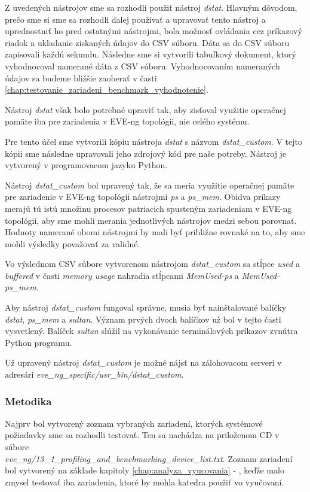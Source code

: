 Z uvedených nástrojov sme sa rozhodli použiť nástroj \emph{dstat}. Hlavným dôvodom, prečo sme si sme sa rozhodli ďalej používať a upravovať tento nástroj a uprednostniť ho pred ostatnými nástrojmi, bola možnosť ovládania cez príkazový riadok a ukladanie ziskaných údajov do CSV súboru. Dáta sa do CSV súboru zapisovali každú sekundu. Následne sme si vytvorili tabuľkový dokument, ktorý vyhodnocoval namerané dáta z CSV súboru. Vyhodnocovaním nameraných údajov sa budeme bližšie zaoberať v časti \ref{chap:testovanie_zariadeni_benchmark_vyhodnotenie}.

Nástroj \emph{dstat} však bolo potrebné upraviť tak, aby zisťoval využitie operačnej pamäte iba pre zariadenia v EVE-ng topológii, nie celého systému.

Pre tento účel sme vytvorili kópiu nástroja \emph{dstat} s názvom \emph{dstat\_custom}. V tejto kópii sme následne upravovali jeho zdrojový kód pre naše potreby. Nástroj je vytvorený v programovacom jazyku Python.

Nástroj \emph{dstat\_custom} bol upravený tak, že sa meria využitie operačnej pamäte pre zariadenie v EVE-ng topológii nástrojmi \emph{ps} a \emph{ps\_mem}. Obidva príkazy merajú tú istú množinu procesov patriacich spusteným zariadeniam v EVE-ng topológii, aby sme mohli merania jednotlivých nástrojov medzi sebou porovnať. Hodnoty namerané obomi nástrojmi by mali byť približne rovnaké na to, aby sme mohli výsledky považovať za validné.

Vo výslednom CSV súbore vytvorenom nástrojom \emph{dstat\_custom} sa stĺpce \emph{used} a \emph{buffered} v časti \emph{memory usage} nahradia stĺpcami \emph{MemUsed-ps} a \emph{MemUsed-ps\_mem}.

Aby nástroj \emph{dstat\_custom} fungoval správne, musia byť nainštalované balíčky \emph{dstat}, \emph{ps\_mem} a \emph{sultan}. Význam prvých dvoch balíčkov už bol v tejto časti vysvetlený. Balíček \emph{sultan} slúžil na vykonávanie terminálových príkazov zvnútra Python programu.

Už upravený nástroj \emph{dstat\_custom} je možné nájsť na zálohovacom serveri v adresári \emph{eve\_ng\_specific/usr\_bin/dstat\_custom}.





\subsubsection{Metodika}

Najprv bol vytvorený zoznam vybraných zariadení, ktorých systémové požiadavky sme sa rozhodli testovať. Ten sa nachádza na priloženom CD v súbore \\ \emph{eve\_ng/13\_1\_profiling\_and\_benchmarking\_device\_list.txt}. Zoznam zariadení bol vytvorený na základe kapitoly \ref{chap:analyza_vyucovania} - , keďže malo zmysel testovať iba zariadenia, ktoré by mohla katedra použiť vo vyučovaní.

